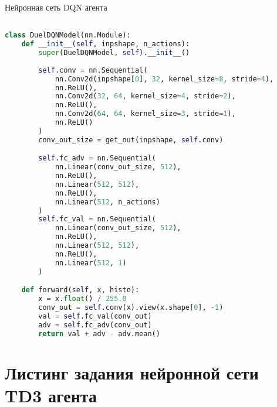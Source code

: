 \begin{ListingEnv}[!h]
\captiondelim{ }
\caption{Нейронная сеть DQN агента}\label{lst:dqn}

\begin{lstlisting}[language=Python]

class DuelDQNModel(nn.Module):
    def __init__(self, inpshape, n_actions):
        super(DuelDQNModel, self).__init__()
        
        self.conv = nn.Sequential(
            nn.Conv2d(inpshape[0], 32, kernel_size=8, stride=4),
            nn.ReLU(),
            nn.Conv2d(32, 64, kernel_size=4, stride=2),
            nn.ReLU(),
            nn.Conv2d(64, 64, kernel_size=3, stride=1),
            nn.ReLU()
        )
        conv_out_size = get_out(inpshape, self.conv)

        self.fc_adv = nn.Sequential(
            nn.Linear(conv_out_size, 512),
            nn.ReLU(),
            nn.Linear(512, 512),
            nn.ReLU(),
            nn.Linear(512, n_actions)
        )
        self.fc_val = nn.Sequential(
            nn.Linear(conv_out_size, 512),
            nn.ReLU(),
            nn.Linear(512, 512),
            nn.ReLU(),
            nn.Linear(512, 1)
        )

    def forward(self, x, histo):
        x = x.float() / 255.0
        conv_out = self.conv(x).view(x.shape[0], -1)
        val = self.fc_val(conv_out)
        adv = self.fc_adv(conv_out)
        return val + adv - adv.mean()
\end{lstlisting}
\end{ListingEnv}

\section{Листинг задания нейронной сети TD3 агента}\label{app:A5}

